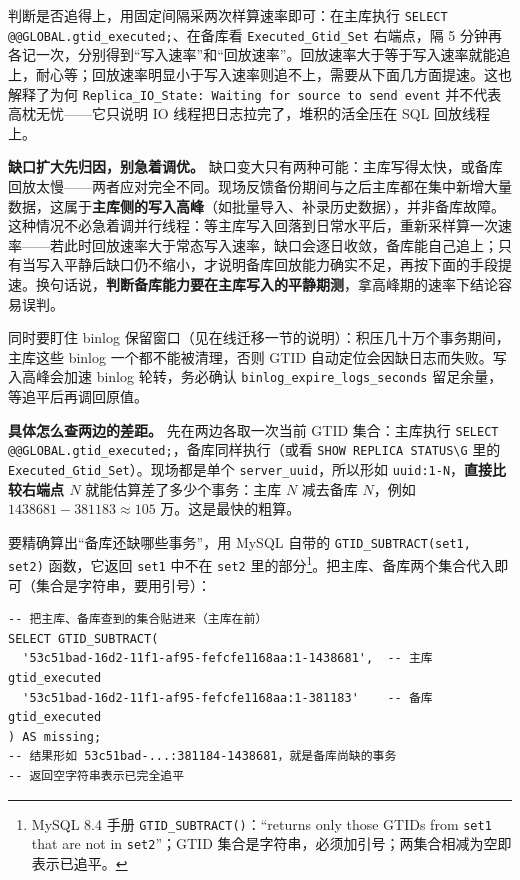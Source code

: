 \documentclass[12pt,UTF8]{ctexbook}
\begin{document}
判断是否追得上，用固定间隔采两次样算速率即可：在主库执行 \verb|SELECT @@GLOBAL.gtid_executed;|、在备库看 \verb|Executed_Gtid_Set| 右端点，隔 5 分钟再各记一次，分别得到“写入速率”和“回放速率”。回放速率大于等于写入速率就能追上，耐心等；回放速率明显小于写入速率则追不上，需要从下面几方面提速。这也解释了为何 \texttt{Replica\_IO\_State: Waiting for source to send event} 并不代表高枕无忧——它只说明 IO 线程把日志拉完了，堆积的活全压在 SQL 回放线程上。

\textbf{缺口扩大先归因，别急着调优。} 缺口变大只有两种可能：主库写得太快，或备库回放太慢——两者应对完全不同。现场反馈备份期间与之后主库都在集中新增大量数据，这属于\textbf{主库侧的写入高峰}（如批量导入、补录历史数据），并非备库故障。这种情况不必急着调并行线程：等主库写入回落到日常水平后，重新采样算一次速率——若此时回放速率大于常态写入速率，缺口会逐日收敛，备库能自己追上；只有当写入平静后缺口仍不缩小，才说明备库回放能力确实不足，再按下面的手段提速。换句话说，\textbf{判断备库能力要在主库写入的平静期测}，拿高峰期的速率下结论容易误判。

同时要盯住 binlog 保留窗口（见在线迁移一节的说明）：积压几十万个事务期间，主库这些 binlog 一个都不能被清理，否则 GTID 自动定位会因缺日志而失败。写入高峰会加速 binlog 轮转，务必确认 \texttt{binlog\_expire\_logs\_seconds} 留足余量，等追平后再调回原值。

\textbf{具体怎么查两边的差距。} 先在两边各取一次当前 GTID 集合：主库执行 \verb|SELECT @@GLOBAL.gtid_executed;|，备库同样执行（或看 \verb|SHOW REPLICA STATUS\G| 里的 \verb|Executed_Gtid_Set|）。现场都是单个 \texttt{server\_uuid}，所以形如 \verb|uuid:1-N|，\textbf{直接比较右端点 $N$} 就能估算差了多少个事务：主库 $N$ 减去备库 $N$，例如 $1438681-381183\approx 105$ 万。这是最快的粗算。

要精确算出“备库还缺哪些事务”，用 MySQL 自带的 \verb|GTID_SUBTRACT(set1, set2)| 函数，它返回 \texttt{set1} 中不在 \texttt{set2} 里的部分\footnote{MySQL 8.4 手册 \texttt{GTID\_SUBTRACT()}：“returns only those GTIDs from \texttt{set1} that are not in \texttt{set2}”；GTID 集合是字符串，必须加引号；两集合相减为空即表示已追平。}。把主库、备库两个集合代入即可（集合是字符串，要用引号）：

\begin{lstlisting}
-- 把主库、备库查到的集合贴进来（主库在前）
SELECT GTID_SUBTRACT(
  '53c51bad-16d2-11f1-af95-fefcfe1168aa:1-1438681',  -- 主库 gtid_executed
  '53c51bad-16d2-11f1-af95-fefcfe1168aa:1-381183'    -- 备库 gtid_executed
) AS missing;
-- 结果形如 53c51bad-...:381184-1438681，就是备库尚缺的事务
-- 返回空字符串表示已完全追平
\end{lstlisting}
\end{document}
